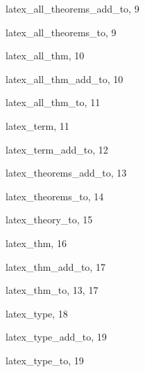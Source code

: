 \begin{theindex}

  \item {\ptt latex\_all\_theorems\_add\_to}, 9
  \item {\ptt latex\_all\_theorems\_to}, 9
  \item {\ptt latex\_all\_thm}, 10
  \item {\ptt latex\_all\_thm\_add\_to}, 10
  \item {\ptt latex\_all\_thm\_to}, 11
  \item {\ptt latex\_term}, 11
  \item {\ptt latex\_term\_add\_to}, 12
  \item {\ptt latex\_theorems\_add\_to}, 13
  \item {\ptt latex\_theorems\_to}, 14
  \item {\ptt latex\_theory\_to}, 15
  \item {\ptt latex\_thm}, 16
  \item {\ptt latex\_thm\_add\_to}, 17
  \item {\ptt latex\_thm\_to}, 13, 17
  \item {\ptt latex\_type}, 18
  \item {\ptt latex\_type\_add\_to}, 19
  \item {\ptt latex\_type\_to}, 19

\end{theindex}
